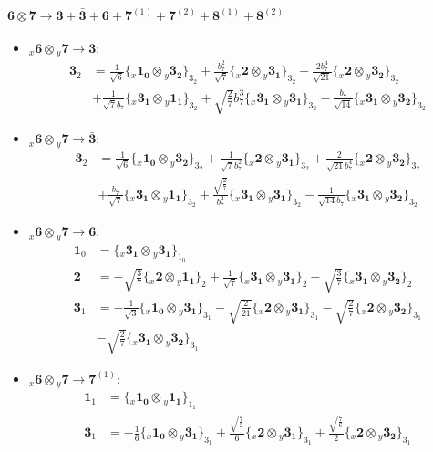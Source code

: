 \documentclass[english]{article}
\newcommand{\rep}[1]{\mathbf{#1}}
\newcommand{\repx}[2]{{}_{#2}\mathbf{#1}}
\newcommand{\subcg}[3]{\big\{ \repx{#1}{x}\otimes\repx{#2}{y}\big\}^{}_{#3}}
\begin{document}
\paragraph*{\Large $\rep{6}\otimes\rep{7}\to\rep{3}+\rep{\bar{3}}+\rep{6}+\rep{7}^{(1)}+\rep{7}^{(2)}+\rep{8}^{(1)}+\rep{8}^{(2)}$}
\begin{itemize}
\item $\repx{6}{x}\otimes\repx{7}{y}\to\rep{3}$:
\begin{align*}
\rep{3}_{2} & = \frac{1}{\sqrt{6}}\subcg{1_{0}}{3_{2}}{3_{2}}+\frac{b_7^2}{\sqrt{7}}\subcg{2}{3_{1}}{3_{2}}+\frac{2 b_7^4}{\sqrt{21}}\subcg{2}{3_{2}}{3_{2}} \\ 
 & +\frac{1}{\sqrt{7} b_7}\subcg{3_{1}}{1_{1}}{3_{2}}+\sqrt{\frac{2}{7}} b_7^3\subcg{3_{1}}{3_{1}}{3_{2}}-\frac{b_7}{\sqrt{14}}\subcg{3_{1}}{3_{2}}{3_{2}}
\end{align*}
\item $\repx{6}{x}\otimes\repx{7}{y}\to\rep{\bar{3}}$:
\begin{align*}
\rep{3}_{2} & = \frac{1}{\sqrt{6}}\subcg{1_{0}}{3_{2}}{3_{2}}+\frac{1}{\sqrt{7} b_7^2}\subcg{2}{3_{1}}{3_{2}}+\frac{2}{\sqrt{21} b_7^4}\subcg{2}{3_{2}}{3_{2}} \\ 
 & +\frac{b_7}{\sqrt{7}}\subcg{3_{1}}{1_{1}}{3_{2}}+\frac{\sqrt{\frac{2}{7}}}{b_7^3}\subcg{3_{1}}{3_{1}}{3_{2}}-\frac{1}{\sqrt{14} b_7}\subcg{3_{1}}{3_{2}}{3_{2}}
\end{align*}
\item $\repx{6}{x}\otimes\repx{7}{y}\to\rep{6}$:
\begin{align*}
\rep{1}_{0} & = \subcg{3_{1}}{3_{1}}{1_{0}}
\\
\rep{2} & = -\sqrt{\frac{3}{7}}\subcg{2}{1_{1}}{2}+\frac{1}{\sqrt{7}}\subcg{3_{1}}{3_{1}}{2}-\sqrt{\frac{3}{7}}\subcg{3_{1}}{3_{2}}{2}
\\
\rep{3}_{1} & = -\frac{1}{\sqrt{3}}\subcg{1_{0}}{3_{1}}{3_{1}}-\sqrt{\frac{2}{21}}\subcg{2}{3_{1}}{3_{1}}-\sqrt{\frac{2}{7}}\subcg{2}{3_{2}}{3_{1}} \\ 
 & -\sqrt{\frac{2}{7}}\subcg{3_{1}}{3_{2}}{3_{1}}
\end{align*}
\item $\repx{6}{x}\otimes\repx{7}{y}\to\rep{7}^{(1)}$:
\begin{align*}
\rep{1}_{1} & = \subcg{1_{0}}{1_{1}}{1_{1}}
\\
\rep{3}_{1} & = -\frac{1}{6}\subcg{1_{0}}{3_{1}}{3_{1}}+\frac{\sqrt{\frac{7}{2}}}{6}\subcg{2}{3_{1}}{3_{1}}+\frac{\sqrt{\frac{7}{6}}}{2}\subcg{2}{3_{2}}{3_{1}} \\ 

\end{align*}
\end{itemize}
\end{document}
